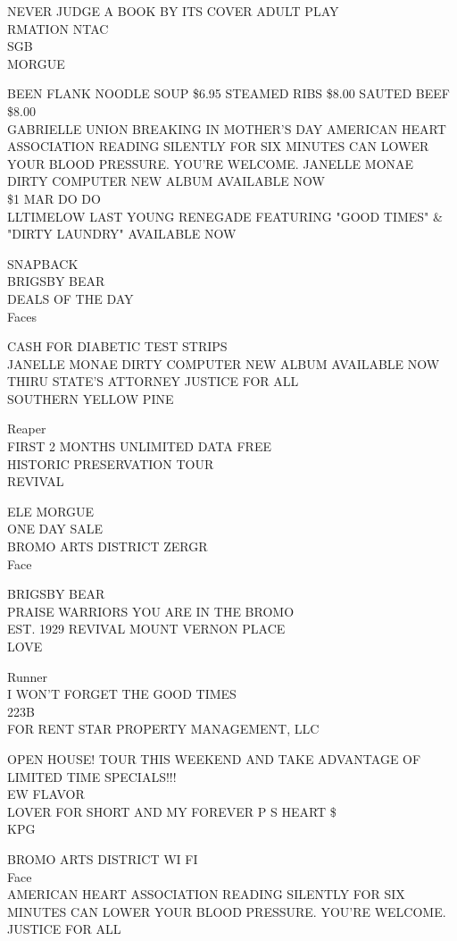 \documentclass[10pt,letterpaper]{article}
\begin{document}
NEVER JUDGE A BOOK BY ITS COVER ADULT PLAY\\
RMATION NTAC\\
SGB\\
MORGUE

BEEN FLANK NOODLE SOUP \$6.95 STEAMED RIBS \$8.00 SAUTED BEEF \$8.00\\
GABRIELLE UNION BREAKING IN MOTHER'S DAY AMERICAN HEART ASSOCIATION READING SILENTLY FOR SIX MINUTES CAN LOWER YOUR BLOOD PRESSURE.  YOU'RE WELCOME. JANELLE MONAE DIRTY COMPUTER NEW ALBUM AVAILABLE NOW\\
\$1 MAR DO DO\\
LLTIMELOW LAST YOUNG RENEGADE FEATURING "GOOD TIMES" \& "DIRTY LAUNDRY" AVAILABLE NOW

SNAPBACK\\
BRIGSBY BEAR\\
DEALS OF THE DAY\\
Faces

CASH FOR DIABETIC TEST STRIPS\\
JANELLE MONAE DIRTY COMPUTER NEW ALBUM AVAILABLE NOW\\
THIRU STATE'S ATTORNEY JUSTICE FOR ALL\\
SOUTHERN YELLOW PINE

Reaper\\
FIRST 2 MONTHS UNLIMITED DATA FREE\\
HISTORIC PRESERVATION TOUR\\
REVIVAL

ELE MORGUE\\
ONE DAY SALE\\
BROMO ARTS DISTRICT ZERGR\\
Face

BRIGSBY BEAR\\
PRAISE WARRIORS YOU ARE IN THE BROMO\\
EST. 1929 REVIVAL MOUNT VERNON PLACE\\
LOVE

Runner\\
I WON'T FORGET THE GOOD TIMES\\
223B\\
FOR RENT STAR PROPERTY MANAGEMENT, LLC

OPEN HOUSE!  TOUR THIS WEEKEND AND TAKE ADVANTAGE OF LIMITED TIME SPECIALS!!!\\
EW FLAVOR\\
LOVER FOR SHORT AND MY FOREVER P S HEART \$\\
KPG

BROMO ARTS DISTRICT WI FI\\
Face\\
AMERICAN HEART ASSOCIATION READING SILENTLY FOR SIX MINUTES CAN LOWER YOUR BLOOD PRESSURE.  YOU'RE WELCOME.\\
JUSTICE FOR ALL
\end{document}
